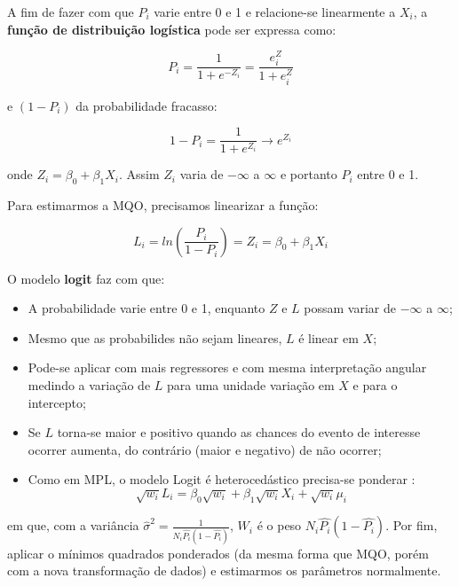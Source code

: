 \documentclass[
]{book}
\begin{document}
A fim de fazer com que \(P_i\) varie entre 0 e 1 e relacione-se linearmente a \(X_i\), a \textbf{função de distribuição logística} pode ser expressa como:

\begin{equation}
    P_i=\frac{1}{1+e^{-Z_i}}=\frac{e^Z_i}{1+e^Z_i}
    \label{eq:logitpi}
\end{equation}

e \((1-P_i)\) da probabilidade fracasso:

\begin{equation}
    1-P_i=\frac{1}{1+e^{Z_i}}\rightarrow e^{Z_i}
    \label{eq:logitmenospi}
\end{equation}

onde \(Z_i=\beta_0+\beta_1X_i\). Assim \(Z_i\) varia de \(-\infty\) a \(\infty\) e portanto \(P_i\) entre 0 e 1.

Para estimarmos a MQO, precisamos linearizar a função:

\begin{equation}
    L_i=ln(\frac{P_i}{1-P_i})=Z_i=\beta_0+\beta_1 X_i
    \label{eq:logitlinear}
\end{equation}

O modelo \textbf{logit} faz com que:

\begin{itemize}
\item
  A probabilidade varie entre 0 e 1, enquanto \(Z\) e \(L\) possam variar de \(-\infty\) a \(\infty\);
\item
  Mesmo que as probabilides não sejam lineares, \(L\) é linear em \(X\);
\item
  Pode-se aplicar com mais regressores e com mesma interpretação angular medindo a variação de \(L\) para uma unidade variação em \(X\) e para o intercepto;
\item
  Se \(L\) torna-se maior e positivo quando as chances do evento de interesse ocorrer aumenta, do contrário (maior e negativo) de não ocorrer;
\item
  Como em MPL, o modelo Logit é heterocedástico precisa-se ponderar \citep{gujarati2011econometria, cox1970analysis}:
  \begin{equation}
    \sqrt{w_i}L_i=\beta_0 \sqrt{w_i}+\beta_1\sqrt{w_i}X_i+\sqrt{w_i}\mu_i 
    \label{eq:mqplogit}
  \end{equation}
\end{itemize}

em que, com a variância \(\hat{\sigma}^2=\frac{1}{N_i\hat{P_i}(1-\hat{P_i})}\), \(W_i\) é o peso \(N_i\hat{P_i}(1-\hat{P_i})\). Por fim, aplicar o mínimos quadrados ponderados (da mesma forma que MQO, porém com a nova transformação de dados) e estimarmos os parâmetros normalmente.
\end{document}
